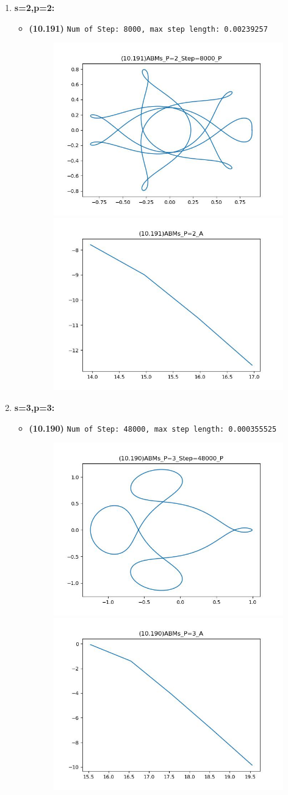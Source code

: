 \documentclass{article}
\begin{document}
\begin{enumerate}
    \item \textbf{s=2,p=2:}
    \begin{itemize}
        \item \textbf{(10.191)} \verb|Num of Step: 8000, max step length: 0.00239257|
        \begin{figure}[h]
            \centering
            \includegraphics[width = 0.42\linewidth]{(10.191)ABMs_P=2_Step=8000_P.jpg}
            \includegraphics[width = 0.42\linewidth]{(10.191)ABMs_P=2_A.jpg}
        \end{figure}
    \end{itemize}
    \item \textbf{s=3,p=3:}
    \begin{itemize}
        \item \textbf{(10.190)} \verb|Num of Step: 48000, max step length: 0.000355525|
        \begin{figure}[h]
            \centering
            \includegraphics[width = 0.42\linewidth]{(10.190)ABMs_P=3_Step=48000_P.jpg}
            \includegraphics[width = 0.42\linewidth]{(10.190)ABMs_P=3_A.jpg}

\end{figure}
\end{itemize}
\end{enumerate}
\end{document}
